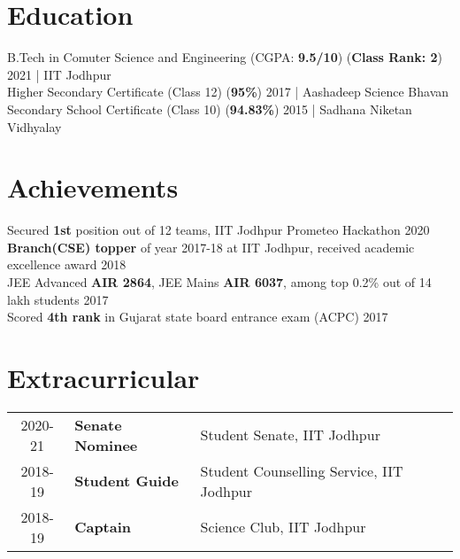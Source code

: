 \documentclass[a4paper]{single-column}
\begin{document}
\section{Education}
  B.Tech in Comuter Science and Engineering (CGPA: \textbf{9.5/10}) (\textbf{Class Rank: 2})
  \hfill 2021 | IIT Jodhpur \\
  Higher Secondary Certificate (Class 12) (\textbf{95\%})
  \hfill 2017 | Aashadeep Science Bhavan \\
  Secondary School Certificate (Class 10) (\textbf{94.83\%})
  \hfill 2015 | Sadhana Niketan Vidhyalay \\

\sectionsep
\section{Achievements}
{Secured \textbf{1st} position out of 12 teams, IIT Jodhpur Prometeo Hackathon \hfill 2020}\\
{\textbf{Branch(CSE) topper} of year 2017-18 at IIT Jodhpur, received academic excellence award \hfill 2018}\\
{JEE Advanced \textbf{AIR 2864}, JEE Mains \textbf{AIR 6037}, among top 0.2\% out of 14 lakh students \hfill 2017}\\
{Scored \textbf{4th rank} in Gujarat state board entrance exam (ACPC) \hfill 2017}

\sectionsep
\section{Extracurricular}
\begin{tabular}{ c l l }
2020-21 & \textbf{Senate Nominee} & Student Senate, IIT Jodhpur \\  
2018-19 & \textbf{Student Guide} & Student Counselling Service, IIT Jodhpur \\
2018-19 & \textbf{Captain} & Science Club, IIT Jodhpur \\
\end{tabular}
\end{document}
